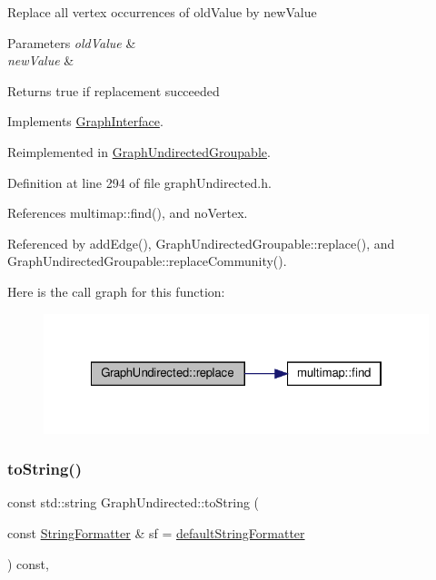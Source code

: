 Replace all vertex occurrences of old\+Value by new\+Value


\begin{DoxyParams}{Parameters}
{\em old\+Value} & \\
\hline
{\em new\+Value} & \\
\hline
\end{DoxyParams}
\begin{DoxyReturn}{Returns}
true if replacement succeeded 
\end{DoxyReturn}


Implements \hyperlink{classGraphInterface_a448a3c66fb5650339f84366257d322ee}{Graph\+Interface}.



Reimplemented in \hyperlink{classGraphUndirectedGroupable_a164600ca9727676ad7b370b9061927d4}{Graph\+Undirected\+Groupable}.



Definition at line 294 of file graph\+Undirected.\+h.



References multimap\+::find(), and no\+Vertex.



Referenced by add\+Edge(), Graph\+Undirected\+Groupable\+::replace(), and Graph\+Undirected\+Groupable\+::replace\+Community().

Here is the call graph for this function\+:\nopagebreak
\begin{figure}[H]
\begin{center}
\leavevmode
\includegraphics[width=322pt]{classGraphUndirected_aee3bc279ffe39f8efb7dd60865279474_cgraph}
\end{center}
\end{figure}
\mbox{\label{classGraphUndirected_a61604a0840f044d52a2762f44635fa9c}} 
\subsubsection{\texorpdfstring{to\+String()}{toString()}}
{\footnotesize\ttfamily const std\+::string Graph\+Undirected\+::to\+String (\begin{DoxyParamCaption}\item[{const \hyperlink{classStringFormatter}{String\+Formatter} \&}]{sf = {\ttfamily \hyperlink{stringFormatter_8h_abf1349c8e24162d0134072aff288f2a2}{default\+String\+Formatter}} }\end{DoxyParamCaption}) const\hspace{0.3cm}{\ttfamily [inline]}, {\ttfamily [virtual]}}

